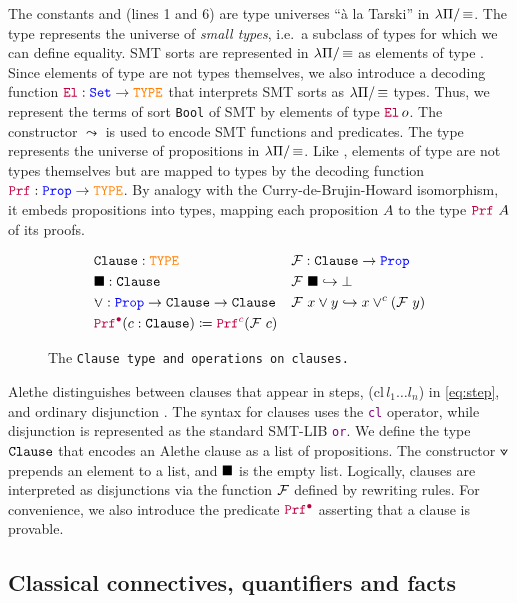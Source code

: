  The constants \set{} and \prop{} (lines 1 and 6) are type universes ``à la Tarski'' \cite[\S Universes]{intuitype} in $\lpm$.
 The type \set{} represents the universe of \textit{small types}, i.e.\ a subclass of types for which we can define equality.
 SMT sorts are represented in $\lpm$ as elements of type \set{}. Since elements of type \set{} are not types themselves, we also introduce a decoding function $\el: \set \rightarrow \type$ that interprets SMT sorts as $\lpm$ types.
 Thus, we represent the terms of sort \texttt{Bool} of SMT by elements of type $\el{}\,o$. The constructor $\leadsto$ is used to encode SMT functions and predicates.
The type \prop{} represents the universe of propositions in $\lpm$. Like \set{}, elements of type \prop{} are not types themselves but are mapped to types by the decoding function $\prf{}: \prop \rightarrow \type$. By analogy with the Curry-de-Brujin-Howard isomorphism, it embeds propositions into types, mapping each proposition $A$ to the type $\prf{}~A$ of its proofs.

\begin{figure}
\begin{align*}
&\tt{Clause}: \type & &\cal{F}: \tt{Clause} \ra \prop \\
&\nil: \tt{Clause} & & \cal{F}~\nil \re \bot \\
&\veedot: \prop \ra \tt{Clause}  \ra \tt{Clause} & & \cal{F}~x \veedot y \re x \lor^c (\cal{F}~y) \\
&\pid (c : \tt{Clause}) \coloneqq \pic (\cal{F}~c) & &  \\
\end{align*}
\caption{The \tt{Clause} type and operations on clauses.}
\end{figure}

Alethe distinguishes between clauses that appear in steps, \colorbox{green!30}{(cl\,$l_1 \dots l_n$)} in \cref{eq:step}, and ordinary disjunction \cite[\S 4]{alethespec}.
The syntax for clauses uses the \textcolor{purple}{\tt{cl}} operator, while disjunction is represented as the standard SMT-LIB \textcolor{purple}{\texttt{or}}.
We define the type $\kw{Clause}$ that encodes an Alethe clause as a list of propositions. The constructor $\veedot$ prepends an element to a list, and $\nil$ is the empty list.
Logically, clauses are interpreted as disjunctions via the function $\cal{F}$ defined by rewriting rules. For convenience, we also introduce the predicate $\pid$ asserting that a clause is provable.

\subsection{Classical connectives, quantifiers and facts}

